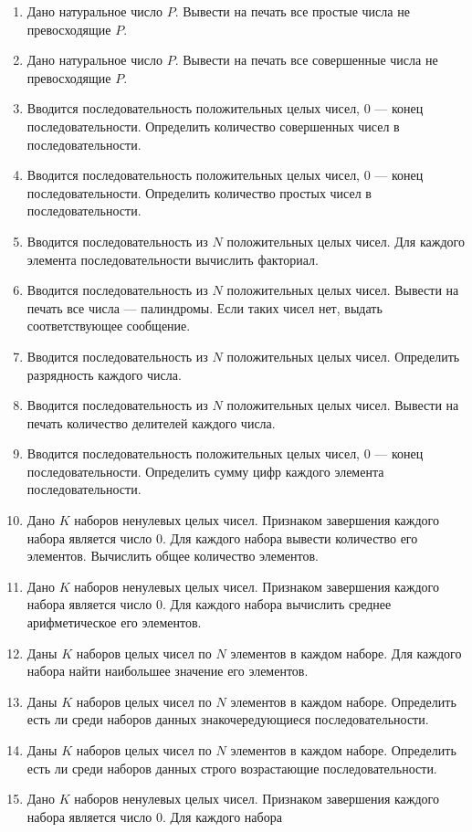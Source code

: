 \begin{enumerate}
\item Дано натуральное число $P$. Вывести на печать все простые числа не
превосходящие $P$.
\item Дано натуральное число $P$. Вывести на печать все совершенные числа не превосходящие
$P$.
\item Вводится последовательность положительных целых чисел, 0 --- конец последовательности. Определить количество
совершенных чисел в последовательности.
\item Вводится последовательность положительных целых чисел, 0 --- конец последовательности. Определить количество простых
чисел в последовательности.
\item Вводится последовательность из $N$ положительных целых чисел. Для каждого элемента
последовательности вычислить факториал.
\item Вводится последовательность из $N$ положительных целых чисел. Вывести на печать все числа ---
палиндромы. Если таких чисел нет, выдать соответствующее сообщение.
\item Вводится последовательность из $N$ положительных целых чисел. Определить разрядность каждого
числа.
\item Вводится последовательность из $N$ положительных целых чисел. Вывести на печать количество
делителей каждого числа.
\item Вводится последовательность положительных целых чисел, 0 --- конец последовательности. Определить сумму цифр каждого
элемента последовательности.
\item Дано $K$ наборов ненулевых целых чисел. Признаком завершения каждого набора является число 0. Для каждого набора
вывести количество его элементов. Вычислить общее количество элементов.
\item Дано $K$ наборов ненулевых целых чисел. Признаком завершения каждого набора является число 0. Для каждого набора
вычислить среднее арифметическое его элементов.
\item Даны $K$ наборов целых чисел по $N$ элементов в каждом наборе. Для каждого набора найти наибольшее значение его
элементов.
\item Даны $K$ наборов целых чисел по $N$ элементов в каждом наборе. Определить есть ли среди наборов данных
знакочередующиеся последовательности.
\item Даны $K$ наборов целых чисел по $N$ элементов в каждом наборе. Определить есть ли среди наборов данных строго
возрастающие последовательности.
\item Дано $K$ наборов ненулевых целых чисел. Признаком завершения каждого набора является число 0. Для каждого набора

\end{enumerate}
